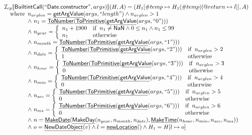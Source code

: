 \documentclass{article}
\newcommand{\SF}[1]{\mbox{\textsf{#1}}}
\newcommand{\wherec}[1]{{\rm where}\begin{array}[t]{l}#1\end{array}}
\newcommand{\ifc}[1]{{\rm if}\begin{array}[t]{l}#1\end{array}}
\newcommand{\owc}{{\rm otherwise}}
\newcommand{\I}{\mathcal{I}}
\newcommand{\lbr}{\llbracket}
\newcommand{\rbr}{\rrbracket}
\newcommand{\hf}[1]{\underline{\sf #1}}
\begin{document}
\[\begin{array}{l}
\I _{cp}\lbr \SF{BuiltintCall}(``\SF{Date.constructor}",args)\rbr(H,A)
  = (H_1[\#temp \mapsto H_1(\#temp)[@return \mapsto l]], A)\\
\quad\wherec{
  n_{arglen} = \hf{getArgValue}(args, ``length") \land n_{arglen} > 1\\
  \land\ n_{1} = \hf{ToNumber}(\hf{ToPrimitive}(\hf{getArgValue}(args, ``0")))\\
  \land\ n_{year} = \left\{\begin{array}{ll}
    n_{1} + 1900
    & \ifc{n_1 \neq \SF{NaN} \land 0 \leq n_1 \land n_1 \leq 99}\\
    n_{1} & \owc
    \end{array}\right.\\
  \land\ n_{month} =  \hf{ToNumber}(\hf{ToPrimitive}(\hf{getArgValue}(args, ``1")))\\
  \land\ n_{date} = \left\{\begin{array}{ll}
    \hf{ToNumber}(\hf{ToPrimitive}(\hf{getArgValue}(args, ``2"))) & \ifc{n_{arglen} > 2}\\
    1 & \owc
    \end{array}\right.\\
  \land\ n_{hour} = \left\{\begin{array}{ll}
    \hf{ToNumber}(\hf{ToPrimitive}(\hf{getArgValue}(args, ``3"))) & \ifc{n_{arglen} > 3}\\
    0 & \owc
    \end{array}\right.\\
  \land\ n_{min} = \left\{\begin{array}{ll}
    \hf{ToNumber}(\hf{ToPrimitive}(\hf{getArgValue}(args, ``4"))) & \ifc{n_{arglen} > 4}\\
    0 & \owc
    \end{array}\right.\\
  \land\ n_{sec} = \left\{\begin{array}{ll}
    \hf{ToNumber}(\hf{ToPrimitive}(\hf{getArgValue}(args, ``5"))) & \ifc{n_{arglen} > 5}\\
    0 & \owc
    \end{array}\right.\\
  \land\ n_{ms} = \left\{\begin{array}{ll}
    \hf{ToNumber}(\hf{ToPrimitive}(\hf{getArgValue}(args, ``6"))) & \ifc{n_{arglen} > 6}\\
    0 & \owc
    \end{array}\right.\\
  \land\ n = \hf{MakeDate}(\hf{MakeDay}(n_{year}, n_{month}, n_{date}),
    \hf{MakeTime}(n_{hour}, n_{min}, n_{sec},n_{ms}))\\
  \land\ o = \hf{NewDateObject}(v) \land l = \hf{newLocation}() \land H_1 = H[l \mapsto o]
  }\\
\\\\


\end{array}\]
\end{document}
